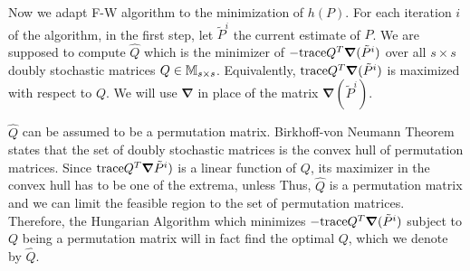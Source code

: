 \documentclass[12pt,oneside,final]{thesis}
\begin{document}
Now we adapt F-W algorithm to the minimization of $h(P)$.  For each iteration $i$ of the algorithm, in the first step, let $\tilde{P}^{i}$ the current estimate of $P$. We are supposed to compute  $\hat{Q}$ which is the minimizer of  $-\textup{trace} Q^{T}\boldsymbol{\nabla}(\tilde{P}^{i})$ over all $s \times s$ doubly stochastic matrices $Q \in \mathbb{M} _{s \times s}$. Equivalently, $\textup{trace} Q^{T}\boldsymbol{\nabla}(\tilde{P}^{i})$ is maximized with respect to $Q$. We will use  $\boldsymbol{\nabla}$ in place of the matrix $\boldsymbol{\nabla}(\tilde{P}^{i})$.

 $\hat{Q}$ can be assumed to be a permutation matrix. Birkhoff-von Neumann Theorem\cite{MatrixTheory} states that the set of doubly stochastic matrices is the convex hull of permutation matrices. Since $\textup{trace}{Q^{T}\boldsymbol{\nabla}\tilde{P}^{i})}$  is a linear function of $Q$, its maximizer in the convex hull has to be one of the extrema, unless 
Thus, $\hat{Q}$  is a permutation matrix and we can limit the feasible region to the set of permutation matrices.
Therefore, the  Hungarian Algorithm which minimizes $-\textup{trace} Q^{T}\boldsymbol{\nabla}(\tilde{P}^{i})$ subject to $Q$ being a permutation matrix will in fact find the optimal $Q$, which we denote by $\hat{Q}$.
\end{document}
